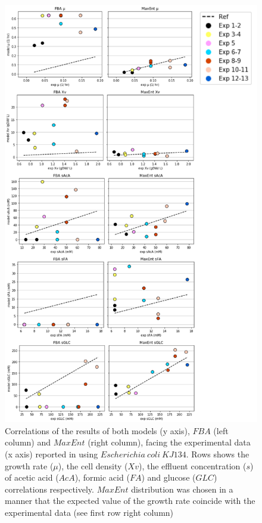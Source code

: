 \documentclass[]{article}
\begin{document}
	\begin{figure}
		\centering
		\includegraphics[scale = 0.7]{corr_s_EColi}
		\caption{Correlations of the results of both models (y axis), $FBA$ (left column) and $MaxEnt$ (right column), facing the experimental data (x axis) reported in \protect{} using $Escherichia\ coli\ KJ134$. Rows shows the growth rate ($\mu$), the cell density ($Xv$), the effluent concentration ($s$) of acetic acid ($AcA$), formic acid ($FA$) and glucose ($GLC$) correlations respectively. $MaxEnt$ distribution was chosen in a manner that the expected value of the growth rate coincide with the experimental data (see first row right column)}
	\end{figure}
	
\end{document}

